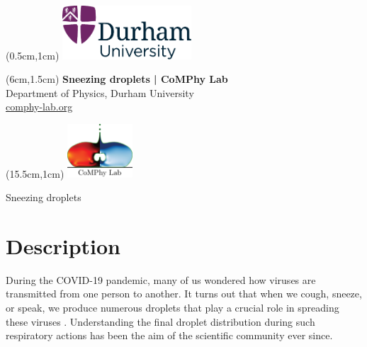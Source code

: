 \documentclass[11pt]{article}
\newlength{\headertobodysep}
\begin{document}
\thispagestyle{empty}

\textblockorigin{0pt}{0pt}

\begin{textblock*}{5cm}(0.5cm,1cm)
    \includegraphics[height=2cm]{../_logosAndRef/Durham-University.pdf}
\end{textblock*}

\begin{textblock*}{9cm}(6cm,1.5cm)
    \centering
    {\large \textbf{Sneezing droplets | CoMPhy Lab}}\\[0.2em]
    Department of Physics, Durham University\\[0.3em]
    \href{https://comphy-lab.org}{comphy-lab.org}
\end{textblock*}

\begin{textblock*}{5cm}(15.5cm,1cm) %
    \includegraphics[height=2cm]{../_logosAndRef/CoMPhy-Lab.png}
\end{textblock*}

\vspace*{\headertobodysep}

\begin{center}
    \begin{LARGE}
     Sneezing droplets
    \end{LARGE}
\end{center}

\section*{Description}

During the COVID-19 pandemic, many of us wondered how viruses are transmitted from one person to another. It turns out that when we cough, sneeze, or speak, we produce numerous droplets that play a crucial role in spreading these viruses \citep{bourouiba2021fluid}. Understanding the final droplet distribution during such respiratory actions has been the aim of the scientific community ever since. 
\end{document}
